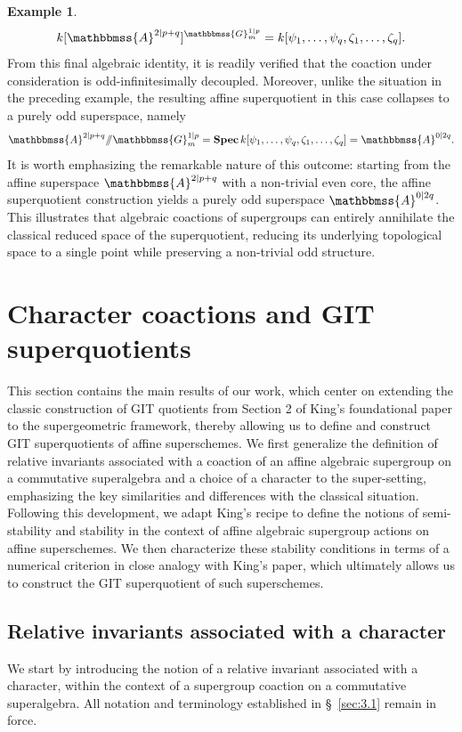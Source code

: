 \documentclass[11pt,a4paper,reqno,noamsfonts]{amsart}
\numberwithin{equation}{section}
\theoremstyle{definition}
\newtheorem{example}[theorem]{Example}
\theoremstyle{remark}
\renewcommand{\AA}{\ensuremath{\mathbbmss{A}}}
\newcommand{\GG}{\ensuremath{\mathbbmss{G}}}
\DeclareMathOperator{\sSpec}{\mathbf{Spec}}
\begin{document}
\begin{example}
$$
k[\AA^{2\vert p+q}]^{\GG_m^{1 \vert p}} = k[\psi_1,\dots,\psi_q,\zeta_1,\dots,\zeta_q]. 
$$
From this final algebraic identity, it is readily verified that the coaction under consideration is odd-infinitesimally decoupled. Moreover, unlike the situation in the preceding example, the resulting affine superquotient in this case collapses to a purely odd superspace, namely
$$
\AA^{2\vert p+q} {\sslash} \GG_m^{1 \vert p} = \sSpec k[\psi_1,\dots,\psi_q,\zeta_1,\dots,\zeta_q] = \AA^{0 \vert 2q}. 
$$
It is worth emphasizing the remarkable nature of this outcome: starting from the affine superspace $\AA^{2\vert p+q}$ with a non-trivial even core, the affine superquotient construction yields a purely odd superspace $\AA^{0 \vert 2q}$. This illustrates that algebraic coactions of supergroups can entirely annihilate the classical reduced space of the superquotient, reducing its underlying topological space to a single point while preserving a non-trivial odd structure.
\end{example}



\section{Character coactions and GIT superquotients}\label{sec:4}
This section contains the main results of our work, which center on extending the classic construction of GIT quotients from Section 2 of King's foundational paper \cite{King1994} to the supergeometric framework, thereby allowing us to define and construct GIT superquotients of affine superschemes. We first generalize the definition of relative invariants associated with a coaction of an affine algebraic supergroup on a commutative superalgebra and a choice of a character to the super-setting, emphasizing the key similarities and differences with the classical situation. Following this development, we adapt King's recipe to define the notions of semi-stability and stability in the context of affine algebraic supergroup actions on affine superschemes. We then characterize these stability conditions in terms of a numerical criterion in close analogy with King's paper, which ultimately allows us to construct the GIT superquotient of such superschemes.

%
\subsection{Relative invariants associated with a character}\label{sec:4.1}
We start by introducing the notion of a relative invariant associated with a character, within the context of a supergroup coaction on a commutative superalgebra. All notation and terminology established in \S~\ref{sec:3.1} remain in force.
\end{document}
